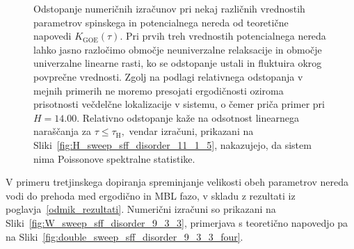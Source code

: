  \begin{figure}[H]
\caption{Odstopanje numeričnih izračunov pri nekaj različnih vrednostih parametrov spinskega in potencialnega nereda od teoretične napovedi $K_\mathrm{GOE}(\tau).$ Pri prvih treh vrednostih potencialnega nereda lahko jasno razločimo območje neuniverzalne relaksacije in območje univerzalne linearne rasti, ko se odstopanje ustali in fluktuira okrog povprečne vrednosti. Zgolj na podlagi relativnega odstopanja v mejnih primerih ne moremo presojati ergodičnosti oziroma prisotnosti večdelčne lokalizacije v sistemu, o čemer priča primer pri $H=14.00.$ Relativno odstopanje kaže na odsotnost linearnega naraščanja za $\tau\leq\tau_\mathrm{H},$ vendar izračuni, prikazani na Sliki~\ref{fig:H_sweep_sff_disorder_11_1_5}, nakazujejo, da sistem nima Poissonove spektralne statistike. }
\label{fig:double_sweep_sff_disorder_11_1_5_four}
\end{figure}
\newpage
\noindent	 
V primeru tretjinskega dopiranja spreminjanje velikosti obeh parametrov nereda vodi do prehoda med ergodično in MBL fazo, v skladu z rezultati iz poglavja~\ref{odmik_rezultati}. Numerični izračuni so prikazani na Sliki~\ref{fig:W_sweep_sff_disorder_9_3_3}, primerjava s teoretično napovedjo pa na Sliki~\ref{fig:double_sweep_sff_disorder_9_3_3_four}.
